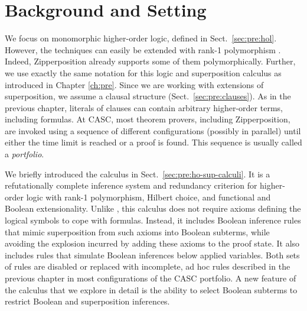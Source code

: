 \section{Background and Setting}
\label{sec:ho-tech:background}

We focus on monomorphic higher-order logic, defined in Sect.~\ref{sec:pre:hol}. However, the
techniques can easily be extended with rank-1 polymorphism \cite{ksr-16-th1}. Indeed, Zipperposition
already supports some of them polymorphically. Further, we use exactly the same
notation for this logic and superposition calculus as introduced in Chapter \ref{ch:pre}. Since we are
working with extensions of superposition, we assume a clausal structure
(Sect.~\ref{sec:pre:clauses}). As in the previous chapter, literals
of clauses can contain arbitrary higher-order terms, including formulas.  
At CASC, most theorem provers, including Zipperposition, are invoked using a
sequence of different configurations (possibly in parallel) until either the
time limit is reached or a proof is found. This sequence is usually called a \emph{portfolio}.

We briefly introduced the \osup{} calculus \cite{bbtv-21-full-ho-sup} in
Sect.~\ref{sec:pre:ho-sup-calculi}. It is a refutationally complete inference
system and redundancy criterion for higher-order logic with rank-1 polymorphism,
Hilbert choice, and functional and Boolean extensionality.
Unlike \lsup{}, this calculus 
does not require axioms defining the logical symbols to cope with formulas.
Instead, it includes Boolean inference rules that mimic
superposition from such axioms into Boolean subterms,
while avoiding the explosion incurred by adding these axioms to the proof state. It
also includes rules that simulate Boolean inferences below applied variables.
Both sets of rules are disabled or replaced with incomplete, ad hoc rules
described in the previous chapter in most configurations
of the CASC portfolio.
A new feature of the calculus that we explore in detail is
the ability to select Boolean subterms
to restrict Boolean and superposition inferences.


